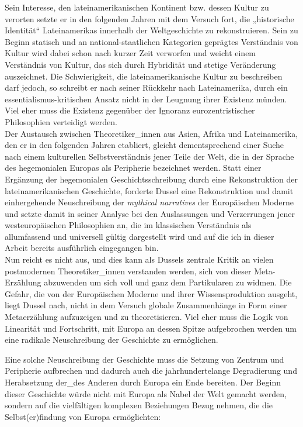 Sein Interesse, den lateinamerikanischen Kontinent bzw. dessen Kultur zu
verorten setzte er in den folgenden Jahren mit dem Versuch fort, die
„historische Identität“\footnotemark {} Lateinamerikas innerhalb der Weltgeschichte zu
rekonstruieren. Sein zu Beginn statisch und an national-staatlichen Kategorien
geprägtes Verständnis von Kultur wird dabei schon nach kurzer Zeit verworfen und
weicht einem Verständnis von Kultur, das sich durch Hybridität und stetige
Veränderung auszeichnet. Die Schwierigkeit, die lateinamerikanische Kultur zu
beschreiben darf jedoch, so schreibt er nach seiner Rückkehr nach Lateinamerika,
durch ein essentialismus-kritischen Ansatz nicht in der Leugnung ihrer Existenz
münden. Viel eher muss die Existenz gegenüber der Ignoranz eurozentristischer
Philosophien verteidigt werden.\\
 Der Austausch zwischen Theoretiker\_innen aus
Asien, Afrika und Lateinamerika, den er in den folgenden Jahren etabliert,
gleicht dementsprechend einer Suche nach einem kulturellen Selbstverständnis
jener Teile der Welt, die in der Sprache des hegemonialen Europas als Peripherie
bezeichnet werden. Statt einer Ergänzung der hegemonialen Geschichtsschreibung
durch eine Rekonstruktion der lateinamerikanischen Geschichte, forderte Dussel
eine Rekonstruktion und damit einhergehende Neuschreibung der \textit{mythical
narratives} der Europäischen Moderne und setzte damit in seiner Analyse bei den
Auslassungen und Verzerrungen jener westeuropäischen Philosophien an, die im
klassischen Verständnis als allumfassend und universell gültig dargestellt wird
und auf die ich in dieser Arbeit bereits ausführlich eingegangen
bin.\footnotemark {}
\\

Nun reicht es nicht aus, und dies kann als Dussels zentrale Kritik an vielen
postmodernen Theoretiker\_innen verstanden werden, sich von dieser Meta-Erzählung
abzuwenden um sich voll und ganz dem Partikularen zu widmen. Die Gefahr, die von
der Europäischen Moderne und ihrer Wissensproduktion ausgeht, liegt Dussel nach,
nicht in dem Versuch globale Zusammenhänge in Form einer Metaerzählung
aufzuzeigen und zu theoretisieren. Viel eher muss die Logik von Linearität und
Fortschritt, mit Europa an dessen Spitze aufgebrochen werden um eine radikale
Neuschreibung der Geschichte zu ermöglichen.

Eine solche Neuschreibung der Geschichte muss die Setzung von Zentrum und
Peripherie aufbrechen und dadurch auch die jahrhundertelange Degradierung und
Herabsetzung der\_des Anderen durch Europa ein Ende bereiten. Der Beginn dieser
Geschichte würde nicht mit Europa als Nabel der Welt gemacht werden, sondern auf
die vielfältigen komplexen Beziehungen Bezug nehmen, die die Selbst(er)findung
von Europa ermöglichten:

